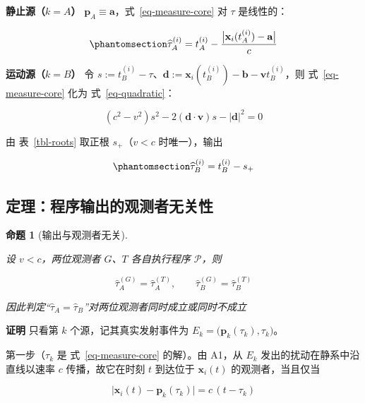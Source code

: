\documentclass[
  chinese,
  a4paper,
  UTF8,
  12pt,
  oneside,
  openany]{ctexbook}
\theoremstyle{plain}
\theoremstyle{plain}
\theoremstyle{plain}
\newtheorem{proposition}{命题}[chapter]
\theoremstyle{definition}
\theoremstyle{plain}
\theoremstyle{plain}
\theoremstyle{remark}
\begin{document}
\textbf{静止源（\(k=A\)）}
\(\mathbf{p}_{A}\equiv\mathbf{a}\)，式~\ref{eq-measure-core} 对 \(\tau\)
是线性的：

\begin{equation}\protect\phantomsection\label{eq-measure-A}{
\widehat{\tau}^{(i)}_{A}=t^{(i)}_{A}-\frac{\bigl|\mathbf{x}_{i}(t^{(i)}_{A})-\mathbf{a}\bigr|}{c}
}\end{equation}

\textbf{运动源（\(k=B\)）} 令
\(s:=t^{(i)}_{B}-\tau\)、\(\mathbf{d}:=\mathbf{x}_{i}(t^{(i)}_{B})-\mathbf{b}-\mathbf{v}t^{(i)}_{B}\)，则
式~\ref{eq-measure-core} 化为 式~\ref{eq-quadratic}：

\[
(c^{2}-v^{2})s^{2}-2(\mathbf{d}\cdot\mathbf{v})s-|\mathbf{d}|^{2}=0
\]

由 表~\ref{tbl-roots} 取正根 \(s_{+}\)（\(v<c\) 时唯一），输出

\begin{equation}\protect\phantomsection\label{eq-measure-B}{
\widehat{\tau}^{(i)}_{B}=t^{(i)}_{B}-s_{+}
}\end{equation}

\subsection{定理：程序输出的观测者无关性}\label{ux5b9aux7406ux7a0bux5e8fux8f93ux51faux7684ux89c2ux6d4bux8005ux65e0ux5173ux6027}

\begin{proposition}[输出与观测者无关]\protect\hypertarget{prp-measurement-invariance}{}\label{prp-measurement-invariance}

设 \(v<c\)，两位观测者 \(G\)、\(T\) 各自执行程序 \(\mathcal{P}\)，则

\[
\widehat{\tau}^{(G)}_{A}=\widehat{\tau}^{(T)}_{A},\qquad
\widehat{\tau}^{(G)}_{B}=\widehat{\tau}^{(T)}_{B}
\]

因此判定``\(\widehat{\tau}_{A}=\widehat{\tau}_{B}\)''对两位观测者同时成立或同时不成立

\end{proposition}

\textbf{证明} 只看第 \(k\) 个源，记其真实发射事件为
\(E_{k}=\bigl(\mathbf{p}_{k}(\tau_{k}),\tau_{k}\bigr)\)。

第一步（\(\tau_{k}\) 是 式~\ref{eq-measure-core} 的解）。由 A1，从
\(E_{k}\) 发出的扰动在静系中沿直线以速率 \(c\) 传播，故它在时刻 \(t\)
到达位于 \(\mathbf{x}_{i}(t)\) 的观测者，当且仅当

\[
\bigl|\mathbf{x}_{i}(t)-\mathbf{p}_{k}(\tau_{k})\bigr|=c\,(t-\tau_{k})
\]
\end{document}
